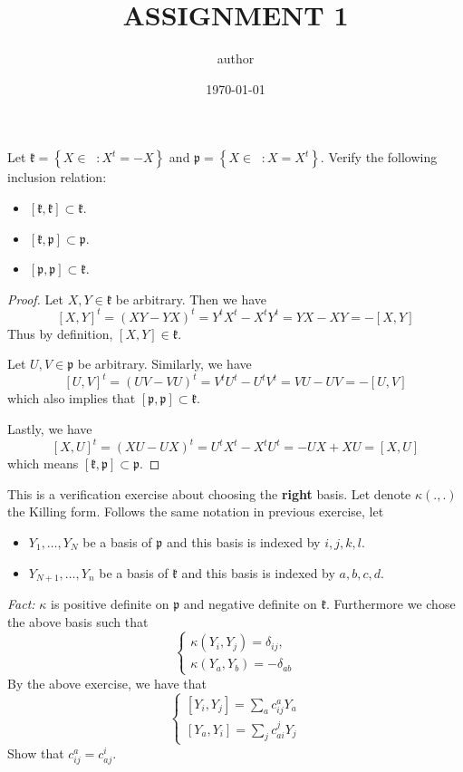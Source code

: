 \documentclass[12pt]{article} %
\title{ASSIGNMENT 1} %
\author{author} %
\date{\today} %
\DeclareMathOperator{\sln}{\mathfrak{sl}_n(\mathbb{R})}
\begin{document}
\maketitle %
\begin{tcolorbox}[colback=blue!5!white,colframe=blue!75!black,title=Problem 1]
  Let $\mathfrak{k} = \left\lbrace X \in \sln : X^t = -X \right\rbrace $ and $ \mathfrak{p } = \left\lbrace X \in \sln: X=X^t\right\rbrace$.
  Verify the following inclusion relation:
  \begin{itemize}
    \item $[\mathfrak{k},\mathfrak{k}] \subset \mathfrak{k}$.
    \item  $[\mathfrak{k},\mathfrak{p}] \subset \mathfrak{p}$.
    \item  $[\mathfrak{p},\mathfrak{p}] \subset \mathfrak{k}$.
  \end{itemize}
\end{tcolorbox}
\begin{proof}
  \hfill

  Let $X,Y \in \mathfrak{k}$ be arbitrary. Then we have
  \[ [X,Y]^t= \left(XY-YX\right)^t=Y^tX^t-X^tY^t=YX-XY = -[X,Y]\]
  Thus by definition, $[X,Y] \in \mathfrak{k}$.

  Let $U,V \in \mathfrak{p}$ be arbitrary. Similarly, we have
  \[[U,V]^t = (UV - VU)^t= V^tU^t- U^tV^t = VU - UV = -[U,V]\]
  which also implies that $[\mathfrak{p},\mathfrak{p}] \subset \mathfrak{k}$.

  Lastly, we have
  \[[X,U]^t = (XU-UX)^t = U^tX^t-X^tU^t = -UX+XU=[X,U]\]
  which means  $[\mathfrak{k},\mathfrak{p}] \subset \mathfrak{p}$.
\end{proof}
\begin{tcolorbox}[colback=blue!5!white,colframe=blue!75!black,title=Problem 2]
  This is a verification exercise about choosing the \textbf{right} basis. Let denote $\kappa(.,.)$
  the Killing form. Follows the same notation in previous exercise, let
  \begin{itemize}
    \item $Y_1,\ldots, Y_N$ be a basis of $\mathfrak{p}$ and this basis is indexed by $i,j,k,l$.
    \item $Y_{N+1},\ldots, Y_n$ be a basis of $\mathfrak{k}$ and this basis is indexed by $a,b,c,d$.
  \end{itemize}
  \textit{Fact: } $\kappa$ is positive definite on $\mathfrak{p}$ and negative definite on $\mathfrak{k}$. Furthermore
  we chose the above basis such that
  \[\begin{cases}
      \kappa(Y_i,Y_j) = \delta_{ij}, \\
      \kappa (Y_a,Y_b) = -\delta_{ab}
    \end{cases}\]
  By the above exercise, we have that
  \[\begin{cases}
      [Y_i,Y_j] = \sum_{a} c^a_{ij}Y_a \\
      [Y_a,Y_i] = \sum_{j} c_{ai}^j Y_j
    \end{cases}\]
  Show that $c^a_{ij} = c^i_{aj}$.
\end{tcolorbox}
\end{document}
